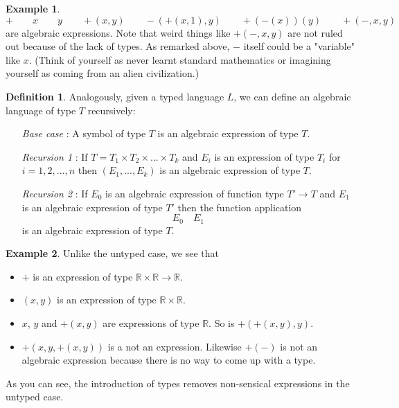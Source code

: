 \documentclass{amsart}
\theoremstyle{definition}
\newtheorem{defn}{Definition}
\newtheorem*{example}{Example}
\newcommand{\R}{\mathbb{R}}
\begin{document}
\begin{example}
$$+ \qquad x \qquad y \qquad +(x, y) \qquad -(+(x, 1), y) \qquad +(-(x))(y) \qquad +(-,x,y)$$
are algebraic expressions. Note that weird things like $+(-, x, y)$ are not ruled out because of the lack of types. As remarked above, $-$ itself could be a "variable" like $x$. (Think of yourself as never learnt standard mathematics or imagining yourself as coming from an alien civilization.)
\end{example}

\begin{defn}
Analogously, given a typed language $L$, we can define an algebraic language of type $T$ recursively:
\begin{itemize}
\item [{\it Base case}]: A symbol of type $T$ is an algebraic expression of type $T$.

\item [{\it Recursion 1}]: If $T = T_1 \times T_2 \times ... \times T_k$ and $E_i$ is an expression of type $T_i$ for $i = 1, 2, ..., n$ then
$(E_1, ..., E_k)$
is an algebraic expression of type $T$.

\item [{\it Recursion 2}]: If $E_0$ is an algebraic expression of function type $T' \rightarrow T$ and $E_1$ is an algebraic expression of type $T'$ then the function application $$E_0 \quad E_1$$ is an algebraic expression of type $T$.
\end{itemize}
\end{defn}

\begin{example}
Unlike the untyped case, we see that
\begin{itemize}
\item $+$ is an expression of type $\R \times \R \rightarrow \R$.
\item $(x, y)$ is an expression of type $\R \times \R$.
\item $x$, $y$ and $+(x, y)$ are expressions of type $\R$. So is $+(+(x, y), y)$.
\item $+(x, y, +(x, y))$ is a not an expression. Likewise $+(-)$ is not an algebraic expression because there is no way to come up with a type.
\end{itemize}
As you can see, the introduction of types removes non-sensical expressions in the untyped case.
\end{example}
\end{document}
